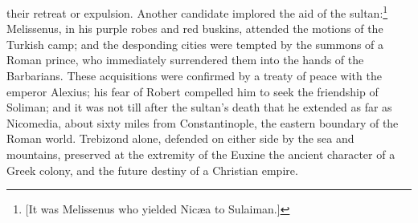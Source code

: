 their retreat or expulsion. Another candidate implored the aid of the sultan:\footnote{[It was Melissenus who yielded Nicæa to Sulaiman.]} Melissenus, in his purple robes and red buskins, attended the motions of the Turkish camp; and the desponding cities were tempted by the summons of a Roman prince, who immediately surrendered them into the hands of the Barbarians. These acquisitions were confirmed by a treaty of peace with the emperor Alexius; his fear of Robert compelled him to seek the friendship of Soliman; and it was not till after the sultan\texthebrew{}’s death that he extended as far as Nicomedia, about sixty miles from Constantinople, the eastern boundary of the Roman world. Trebizond alone, defended on either side by the sea and mountains, preserved at the extremity of the Euxine the ancient character of a Greek colony, and the future destiny of a Christian empire.

